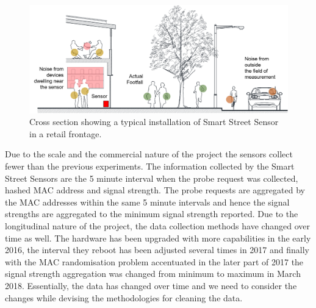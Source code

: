 \begin{figure}
  \includegraphics{images/sss.png}
  \caption{Cross section showing a typical installation of Smart Street Sensor in a retail frontage.}
  \label{figure:collection:sss:typical}
\end{figure}

Due to the scale and the commercial nature of the project the sensors collect fewer than the previous experiments.
The information collected by the Smart Street Sensors are the 5 minute interval when the probe request was collected, hashed MAC address and signal strength.
The probe requests are aggregated by the MAC addresses within the same 5 minute intervals and hence the signal strengths are aggregated to the minimum signal strength reported. 
Due to the longitudinal nature of the project, the data collection methods have changed over time as well.
The hardware has been upgraded with more capabilities in the early 2016, the interval they reboot has been adjusted several times in 2017 and finally with the MAC randomisation problem accentuated in the later part of 2017 the signal strength aggregation was changed from minimum to maximum in March 2018.
Essentially, the data has changed over time and we need to consider the changes while devising the methodologies for cleaning the data.
